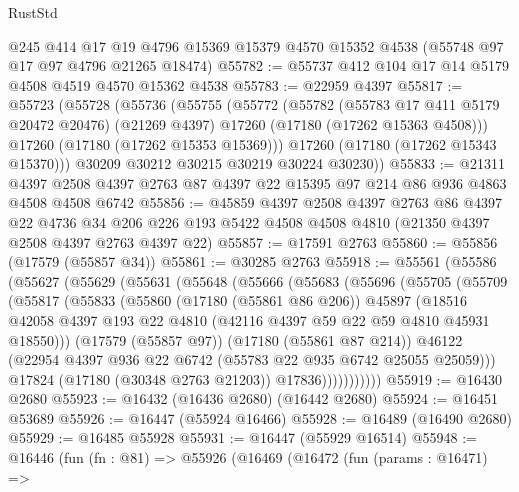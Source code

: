 \begin{lexlean}{RustStd}
\begin{coremodule}
    @245
    @414
    @17
    @19
    @4796
    @15369
    @15379
    @4570
    @15352
    @4538
    (@55748 @97 @17 @97 @4796 @21265 @18474)
@55782 := @55737 @412 @104 @17 @14 @5179 @4508 @4519 @4570 @15362 @4538
@55783 := @22959 @4397
@55817 := @55723
    (@55728
      (@55736
        (@55755
          (@55772
            (@55782
              (@55783 @17 @411 @5179 @20472 @20476)
              (@21269 @4397)
              @17260
              (@17180 (@17262 @15363 @4508)))
            @17260
            (@17180 (@17262 @15353 @15369)))
          @17260
          (@17180 (@17262 @15343 @15370)))
        @30209
        @30212
        @30215
        @30219
        @30224
        @30230))
@55833 := @21311
    @4397
    @2508
    @4397
    @2763
    @87
    @4397
    @22
    @15395
    @97
    @214
    @86
    @936
    @4863
    @4508
    @4508
    @6742
@55856 := @45859
    @4397
    @2508
    @4397
    @2763
    @86
    @4397
    @22
    @4736
    @34
    @206
    @226
    @193
    @5422
    @4508
    @4508
    @4810
    (@21350 @4397 @2508 @4397 @2763 @4397 @22)
@55857 := @17591 @2763
@55860 := @55856 (@17579 (@55857 @34))
@55861 := @30285 @2763
@55918 := @55561
    (@55586
      (@55627
        (@55629
          (@55631
            (@55648
              (@55666
                (@55683
                  (@55696
                    (@55705
                      (@55709
                        (@55817
                          (@55833
                            (@55860
                              (@17180 (@55861 @86 @206))
                              @45897
                              (@18516
                                @42058
                                @4397
                                @193
                                @22
                                @4810
                                (@42116 @4397 @59 @22 @59 @4810 @45931 @18550)))
                            (@17579 (@55857 @97))
                            (@17180 (@55861 @87 @214))
                            @46122
                            (@22954 @4397 @936 @22 @6742 (@55783 @22 @935 @6742 @25055 @25059)))
                          @17824
                          (@17180 (@30348 @2763 @21203))
                          @17836)))))))))))
@55919 := @16430 @2680
@55923 := @16432 (@16436 @2680) (@16442 @2680)
@55924 := @16451 @53689
@55926 := @16447 (@55924 @16466)
@55928 := @16489 (@16490 @2680)
@55929 := @16485 @55928
@55931 := @16447 (@55929 @16514)
@55948 := @16446
    (fun (fn : @81) =>
    @55926
      (@16469
        (@16472
          (fun (params : @16471) =>

\end{coremodule}
\end{lexlean}
